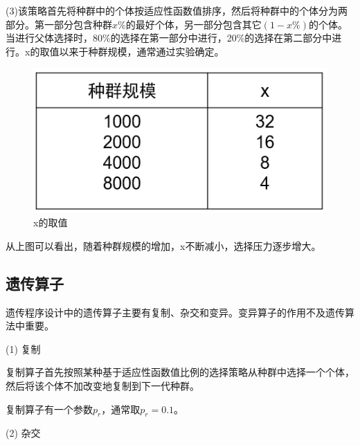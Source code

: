 \documentclass[UTF8]{ctexart}
\begin{document}
	(3)该策略首先将种群中的个体按适应性函数值排序，然后将种群中的个体分为两部分。第一部分包含种群$x\%$的最好个体，另一部分包含其它$(1-x\%)$的个体。当进行父体选择时，80\%的选择在第一部分中进行，20\%的选择在第二部分中进行。x的取值以来于种群规模，通常通过实验确定。
	\begin{figure}[ht]
		\centering	
		\includegraphics[scale=0.3]{images/x_value.png}
		\caption{x的取值}
		\label{fig:label}
	\end{figure}
	
	从上图可以看出，随着种群规模的增加，x不断减小，选择压力逐步增大。
	
\subsection{遗传算子}
	遗传程序设计中的遗传算子主要有复制、杂交和变异。变异算子的作用不及遗传算法中重要。
	
	(1) 复制
	
	复制算子首先按照某种基于适应性函数值比例的选择策略从种群中选择一个个体，然后将该个体不加改变地复制到下一代种群。
	
	复制算子有一个参数$p_{r}$，通常取$p_{r}=0.1$。
	
	(2) 杂交
	
\end{document}
